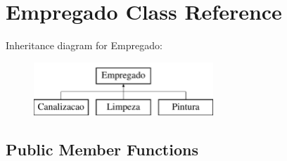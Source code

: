 \hypertarget{class_empregado}{}\section{Empregado Class Reference}
\label{class_empregado}
Inheritance diagram for Empregado\+:\begin{figure}[H]
\begin{center}
\leavevmode
\includegraphics[height=2.000000cm]{class_empregado}
\end{center}
\end{figure}
\subsection*{Public Member Functions}
